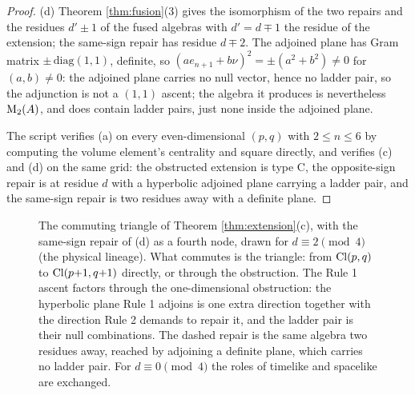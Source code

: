 \begin{proof}
(d) Theorem \ref{thm:fusion}(3) gives the isomorphism of the two repairs and the residues $d' \pm 1$ of the fused algebras with $d' = d \mp 1$ the residue of the extension; the same-sign repair has residue $d \mp 2$. The adjoined plane has Gram matrix $\pm\,\mathrm{diag}(1,1)$, definite, so $(a e_{n+1} + b\nu)^2 = \pm(a^2 + b^2) \neq 0$ for $(a,b) \neq 0$: the adjoined plane carries no null vector, hence no ladder pair, so the adjunction is not a $(1,1)$ ascent; the algebra it produces is nevertheless $\mathrm{M}_2(A)$, and does contain ladder pairs, just none inside the adjoined plane.

The script verifies (a) on every even-dimensional $(p,q)$ with $2 \leq n \leq 6$ by computing the volume element's centrality and square directly, and verifies (c) and (d) on the same grid: the obstructed extension is type C, the opposite-sign repair is at residue $d$ with a hyperbolic adjoined plane carrying a ladder pair, and the same-sign repair is two residues away with a definite plane.
\end{proof}

\begin{figure}[t]
\centering
{}
\caption{The commuting triangle of Theorem \ref{thm:extension}(c), with the same-sign repair of (d) as a fourth node, drawn for $d \equiv 2 \pmod 4$ (the physical lineage). What commutes is the triangle: from $\mathrm{Cl}(p,q)$ to $\mathrm{Cl}(p{+}1,q{+}1)$ directly, or through the obstruction. The Rule 1 ascent factors through the one-dimensional obstruction: the hyperbolic plane Rule 1 adjoins is one extra direction together with the direction Rule 2 demands to repair it, and the ladder pair is their null combinations. The dashed repair is the same algebra two residues away, reached by adjoining a definite plane, which carries no ladder pair. For $d \equiv 0 \pmod 4$ the roles of timelike and spacelike are exchanged.}
\label{fig:square}
\end{figure}


